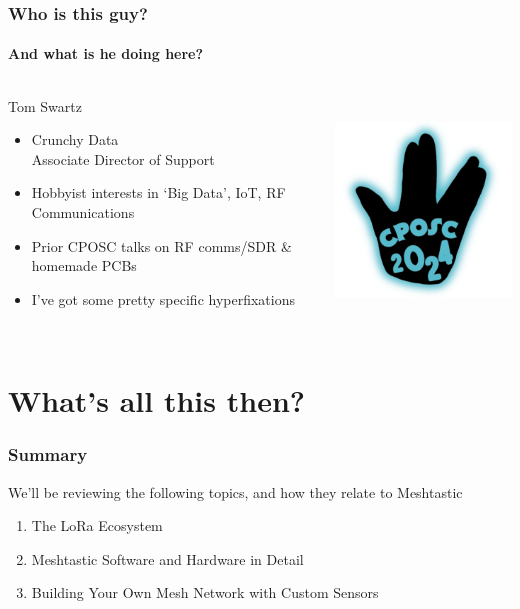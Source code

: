 \documentclass[aspectratio=169]{beamer}
\begin{document}
\begin{frame}
  \frametitle{Who is this guy?}
  \framesubtitle{And what is he doing here?}
  \begin{columns}[]
    \begin{column}[T]{0.45\paperwidth}
      {\huge{Tom Swartz}}
      \vfill{}
      \begin{itemize}[<+->]
        \item{Crunchy Data \\ Associate Director of Support}
        \item{Hobbyist interests in `Big Data', IoT, RF Communications}
        \item{Prior CPOSC talks on RF comms/SDR \& homemade PCBs}
        \item{I've got some pretty specific hyperfixations}
      \end{itemize}
    \end{column}
    \begin{column}[T]{0.45\paperwidth}
      \includegraphics[height=6cm,keepaspectratio]{images/logo.png}
    \end{column}
  \end{columns}
\end{frame}

\section{What's all this then?}
\begin{frame}
  \frametitle{Summary}
  We'll be reviewing the following topics, and how they relate to Meshtastic
  \begin{enumerate}
    \item{The LoRa Ecosystem}
    \item{Meshtastic Software and Hardware in Detail}
    \item{Building Your Own Mesh Network with Custom Sensors}
  \end{enumerate}
\end{frame}
\end{document}
